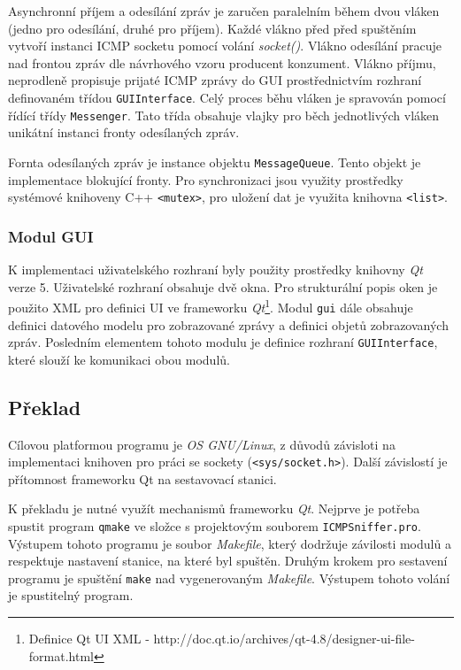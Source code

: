 \documentclass[12pt, a4paper]{article}
\begin{document}
Asynchronní příjem a odesílání zpráv je zaručen paralelním během dvou vláken (jedno pro odesílání, druhé pro příjem). Každé vlákno před před spuštěním vytvoří instanci ICMP socketu pomocí volání \emph{socket()}. Vlákno odesílání pracuje nad frontou zpráv dle návrhového vzoru producent konzument. Vlákno příjmu, neprodleně propisuje prijaté ICMP zprávy do GUI prostřednictvím rozhraní definovaném třídou \texttt{GUIInterface}. Celý proces běhu vláken je spravován pomocí řídící třídy \texttt{Messenger}. Tato třída obsahuje vlajky pro běch jednotlivých vláken unikátní instanci fronty odesílaných zpráv.

Fornta odesílaných zpráv je instance objektu \texttt{MessageQueue}. Tento objekt je implementace blokující fronty. Pro synchronizaci jsou využity prostředky systémové knihoveny C++ \texttt{<mutex>}, pro uložení dat je využita knihovna \texttt{<list>}.

\subsubsection{Modul GUI}

K implementaci uživatelského rozhraní byly použity prostředky knihovny \emph{Qt} verze 5. Uživatelské rozhraní obsahuje dvě okna. Pro strukturální popis oken je použito XML pro definici UI ve frameworku \emph{Qt}\footnote{Definice Qt UI XML - http://doc.qt.io/archives/qt-4.8/designer-ui-file-format.html}. Modul \texttt{gui} dále obsahuje definici datového modelu pro zobrazované zprávy a definici objetů zobrazovaných zpráv. Posledním elementem tohoto modulu je definice rozhraní \texttt{GUIInterface}, které slouží ke komunikaci obou modulů.

\subsection{Překlad}

Cílovou platformou programu je \emph{OS GNU/Linux}, z důvodů závisloti na implementaci knihoven pro práci se sockety (\texttt{<sys/socket.h>}). Další závislostí je přítomnost frameworku Qt na sestavovací stanici.

K překladu je nutné využít mechanismů frameworku \emph{Qt}. Nejprve je potřeba spustit program \texttt{qmake} ve složce s projektovým souborem \texttt{ICMPSniffer.pro}. Výstupem tohoto programu je soubor \emph{Makefile}, který dodržuje závilosti modulů a respektuje nastavení stanice, na které byl spuštěn. Druhým krokem pro sestavení programu je spuštění \texttt{make} nad vygenerovaným \emph{Makefile}. Výstupem tohoto volání je spustitelný program.
\end{document}
